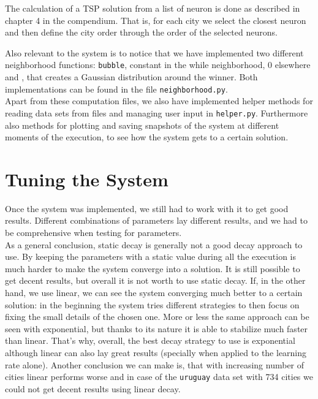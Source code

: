 \documentclass[11pt]{article}
\begin{document}
The calculation of a TSP solution from a list of neuron is done as described in chapter 4 in the compendium. That is, for each city we select the closest neuron and then define the city order through the order of the selected neurons. 


Also relevant to the system is to notice that we have implemented two different
neighborhood functions: \texttt{bubble}, constant in the while neighborhood, 0 elsewhere and , that creates a Gaussian
distribution around the winner. Both implementations can be found in the file
\texttt{neighborhood.py}.\\

Apart from these computation files, we also have implemented helper methods for reading data sets from files and managing
user input  in \texttt{helper.py}. Furthermore also methods for plotting and saving
snapshots of the system at different moments of the execution, to see how the
system gets to a certain solution.


\section{Tuning the System}

Once the system was implemented, we still had to work with it to get good
results. Different combinations of parameters lay different results,
and we had to be comprehensive when testing for parameters.\\

As a general conclusion, static decay is generally not a good decay approach to
use. By keeping the parameters with a static value during all the execution is
much harder to make the system converge into a solution. It is still possible to
get decent results, but overall it is not worth to use static decay. If, in the
other hand, we use linear, we can see the system converging much better to a
certain solution: in the beginning the system tries different strategies to then
focus on fixing the small details of the chosen one. More or less the same
approach can be seen with exponential, but thanks to its nature it is able to
stabilize much faster than linear. That's why, overall, the best decay strategy
to use is exponential although linear can also lay great results (specially when
applied to the learning rate alone). Another conclusion we can make is, that with increasing number of cities linear performs worse and in case of the \texttt{uruguay} data set with 734 cities we could not get decent results using linear decay.\\
\end{document}
